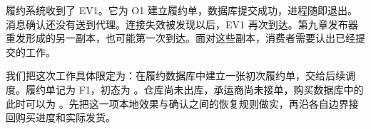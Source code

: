 \newcommand{\CTenFigure}[3]{%
  \begin{figure}[htbp]
  \centering
  \begingroup
  \definecolor{Blue}{HTML}{315E76}
  \definecolor{Pale}{HTML}{F1F5F7}
  \definecolor{Gold}{HTML}{A96B34}
  \tikzset{every node/.style={font=\small\sffamily,align=center},
    box/.style={draw=Blue,rounded corners=2pt,fill=Pale,inner sep=7pt,text width=3.6cm,minimum height=1cm},
    good/.style={box,fill=green!5!white,draw=green!35!black},
    warn/.style={box,fill=orange!7,draw=Gold},
    arr/.style={-{Stealth[length=2mm]},thick,draw=Blue},
    note/.style={font=\footnotesize\sffamily,align=center,text=black!75},
    lane/.style={draw=black!35,densely dashed}}
  \resizebox{.98\linewidth}{!}{}
  \endgroup
  \caption{#2}\label{#3}
  \end{figure}}

履约系统收到了 EV1。它为 O1 建立履约单，数据库提交成功，进程随即退出。消息确认还没有送到代理。连接失效被发现以后，EV1 再次到达。第九章发布器重发形成的另一副本，也可能第一次到达。面对这些副本，消费者需要认出已经提交的工作。

我们把这次工作具体限定为：在履约数据库中建立一张初次履约单，交给后续调度。履约单记为 F1，初态为 。仓库尚未出库，承运商尚未接单，购买数据库中的  此时可以为 。先把这一项本地效果与确认之间的恢复规则做实，再沿各自边界接回购买进度和实际发货。
